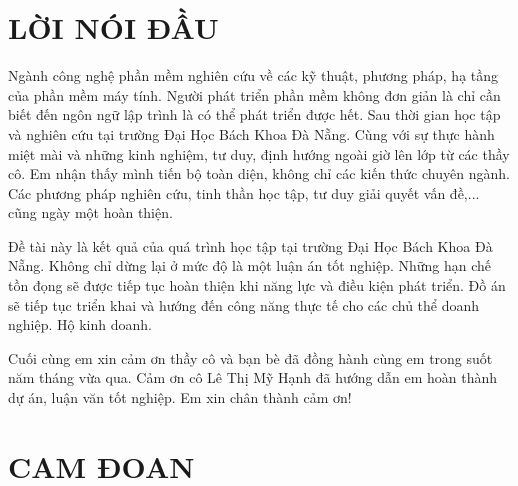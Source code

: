 \documentclass[11pt]{report}
\begin{document}
	\setcounter{page}{1}

	\clearpage

	\chapter*{LỜI NÓI ĐẦU}
	\fontsize{13px}{13px}\selectfont\justifying
	Ngành công nghệ phần mềm nghiên cứu về các kỹ thuật, phương pháp, hạ tầng của phần mềm máy tính. Người phát triển phần mềm không đơn giản là chỉ cần biết đến ngôn ngữ lập trình là có thể phát triển được hết. Sau thời gian học tập và nghiên cứu tại trường Đại Học Bách Khoa Đà Nẵng. Cùng với sự thực hành miệt mài và những kinh nghiệm, tư duy, định hướng ngoài giờ lên lớp từ các thầy cô. Em nhận thấy mình tiến bộ toàn diện, không chỉ các kiến thức chuyên ngành. Các phương pháp nghiên cứu, tinh thần học tập, tư duy giải quyết vấn đề,... cũng ngày một hoàn thiện.
	
	Đề tài này là kết quả của quá trình học tập tại trường Đại Học Bách Khoa Đà Nẵng. Không chỉ dừng lại ở mức độ là một luận án tốt nghiệp. Những hạn chế tồn đọng sẽ được tiếp tục hoàn thiện khi năng lực và điều kiện phát triển. Đồ án sẽ tiếp tục triển khai và hướng đến công năng thực tế cho các chủ thể doanh nghiệp. Hộ kinh doanh.
	
	Cuối cùng em xin cảm ơn thầy cô và bạn bè đã đồng hành cùng em trong suốt năm tháng vừa qua. Cảm ơn cô Lê Thị Mỹ Hạnh đã hướng dẫn em hoàn thành dự án, luận văn tốt nghiệp. Em xin chân thành cảm ơn!	
	\pagebreak
	
	\restoregeometry%
	\chapter*{CAM ĐOAN}
	\fontsize{13px}{13px}\selectfont\justifying
	
\end{document}
